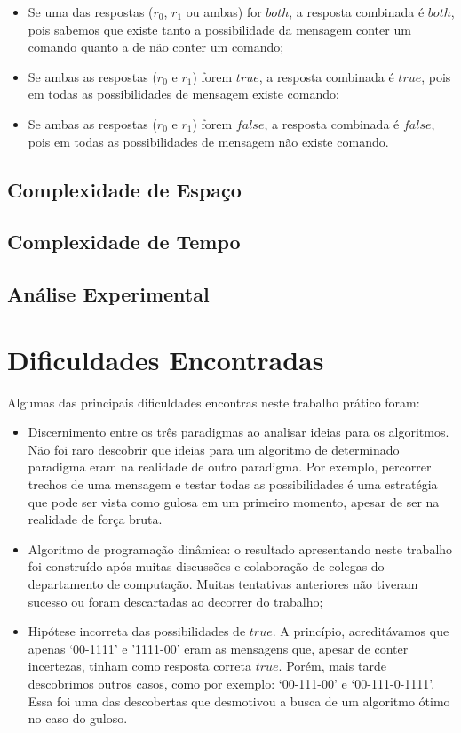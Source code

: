 \documentclass[a4paper,12pt,titlepage]{article}
\begin{document}
\begin{itemize}[leftmargin=1.6cm]
    \item Se uma das respostas ($r_0$, $r_1$ ou ambas) for $both$, a resposta combinada é $both$, pois sabemos que existe tanto a possibilidade da mensagem conter um comando quanto a de não conter um comando;
    \item Se ambas as respostas ($r_0$ e $r_1$) forem $true$, a resposta combinada é $true$, pois em todas as possibilidades de mensagem existe comando;
    \item Se ambas as respostas ($r_0$ e $r_1$) forem $false$, a resposta combinada é $false$, pois em todas as possibilidades de mensagem não existe comando.
    \ \\
\end{itemize}







\subsection{Complexidade de Espaço}
\subsection{Complexidade de Tempo}
\subsection{Análise Experimental}


\section{Dificuldades Encontradas}

Algumas das principais dificuldades encontras neste trabalho prático foram: 
\begin{itemize}[leftmargin=1.6cm]
    \item Discernimento entre os três paradigmas ao analisar ideias para os algoritmos. Não foi raro descobrir que ideias para um algoritmo de determinado paradigma eram na realidade de outro paradigma. Por exemplo, percorrer trechos de uma mensagem e testar todas as possibilidades é uma estratégia que pode ser vista como gulosa em um primeiro momento, apesar de ser na realidade de força bruta.
    \item Algoritmo de programação dinâmica: o resultado apresentando neste trabalho foi construído após muitas discussões e colaboração de colegas do departamento de computação. Muitas tentativas anteriores não tiveram sucesso ou foram descartadas ao decorrer do trabalho;
    \item Hipótese incorreta das possibilidades de $true$. A princípio, acreditávamos que apenas `00-1111' e '1111-00' eram as mensagens que, apesar de conter incertezas, tinham como resposta correta $true$. Porém, mais tarde descobrimos outros casos, como por exemplo: `00-111-00' e `00-111-0-1111'. Essa foi uma das descobertas que desmotivou a busca de um algoritmo ótimo no caso do guloso.
    \ \\
\end{itemize}
\end{document}
